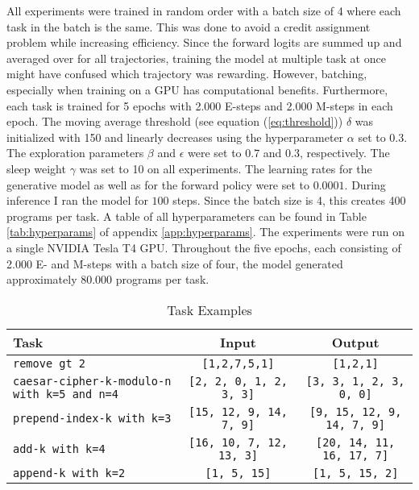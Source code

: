 All experiments were trained in random order with a batch size of 4 where each task in the batch is the same. This was done to avoid a credit assignment problem while increasing efficiency. Since the forward logits are summed up and averaged over for all trajectories, training the model at multiple task at once might have confused which trajectory was rewarding. However, batching, especially when training on a GPU has computational benefits.
Furthermore, each task is trained for 5 epochs with 2.000 E-steps and 2.000 M-steps in each epoch. The moving average threshold (see equation (\ref{eq:threshold})) $\delta$ was initialized with 150 and linearly decreases using the hyperparameter $\alpha$ set to 0.3. The exploration parameters $\beta$ and $\epsilon$ were set to $0.7$ and $0.3$, respectively. The sleep weight $\gamma$ was set to 10 on all experiments. 
The learning rates for the generative model as well as for the forward policy were set to $0.0001$. During inference I ran the model for $100$ steps. Since the batch size is 4, this creates 400 programs per task. A table of all hyperparameters can be found in Table \ref{tab:hyperparams} of appendix \ref{app:hyperparams}. The experiments were run on a single NVIDIA Tesla T4 GPU. Throughout the five epochs, each consisting of 2.000 E- and M-steps with a batch size of four, the model generated approximately 80.000 programs per task.

\begin{table}[H]
    \centering
    \begin{tabular}{|p{5cm}|c|c|}
        \hline
        \textbf{Task} & \textbf{Input} & \textbf{Output} \\\hline
        \texttt{remove gt 2} & \texttt{[1,2,7,5,1]} & \texttt{[1,2,1]} \\\hline
        \texttt{caesar-cipher-k-modulo-n with k=5 and n=4} & \texttt{[2, 2, 0, 1, 2, 3, 3]} & \texttt{[3, 3, 1, 2, 3, 0, 0]} \\\hline
        \texttt{prepend-index-k with k=3} & \texttt{[15, 12, 9, 14, 7, 9]} & \texttt{[9, 15, 12, 9, 14, 7, 9]} \\\hline
        \texttt{add-k with k=4} & \texttt{[16, 10, 7, 12, 13, 3]} & \texttt{[20, 14, 11, 16, 17, 7]} \\\hline
        \texttt{append-k with k=2} & \texttt{[1, 5, 15]} & \texttt{[1, 5, 15, 2]} \\\hline
    \end{tabular}
    \caption{Task Examples}
    \label{tab:task_ex}
\end{table}




